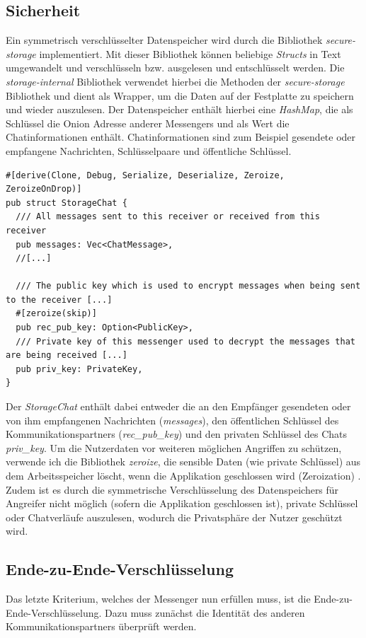 \documentclass[a4paper,ngerman, headheight=28pt,12pt]{scrartcl}
\newcommand{\vcite}[1]{\cite[vgl.][]{#1}}
\begin{document}
\subsection{Sicherheit}
Ein symmetrisch verschlüsselter Datenspeicher wird durch die Bibliothek \textit{secure-storage} implementiert. Mit dieser Bibliothek können beliebige \textit{Structs} in Text umgewandelt und verschlüsseln bzw. ausgelesen und entschlüsselt werden. Die \textit{storage-internal} Bibliothek verwendet hierbei die Methoden der \textit{secure-storage} Bibliothek und dient als Wrapper, um die Daten auf der Festplatte zu speichern und wieder auszulesen. Der Datenspeicher enthält hierbei eine \textit{HashMap}, die als Schlüssel die Onion Adresse anderer Messengers und als Wert die Chatinformationen enthält. Chatinformationen sind zum Beispiel gesendete oder empfangene Nachrichten, Schlüsselpaare und öffentliche Schlüssel.
\begin{verbatim}
#[derive(Clone, Debug, Serialize, Deserialize, Zeroize, ZeroizeOnDrop)]
pub struct StorageChat {
  /// All messages sent to this receiver or received from this receiver
  pub messages: Vec<ChatMessage>,
  //[...]

  /// The public key which is used to encrypt messages when being sent to the receiver [...]
  #[zeroize(skip)]
  pub rec_pub_key: Option<PublicKey>,
  /// Private key of this messenger used to decrypt the messages that are being received [...]
  pub priv_key: PrivateKey,
}
\end{verbatim}
Der \textit{StorageChat} enthält dabei entweder die an den Empfänger gesendeten oder von ihm empfangenen Nachrichten (\textit{messages}), den öffentlichen Schlüssel des Kommunikationspartners (\textit{rec\_pub\_key}) und den privaten Schlüssel des Chats \textit{priv\_key}.
Um die Nutzerdaten vor weiteren möglichen Angriffen zu schützen, verwende ich die Bibliothek \textit{zeroize}, die sensible Daten (wie private Schlüssel) aus dem Arbeitsspeicher löscht, wenn die Applikation geschlossen wird (Zeroization) \vcite{Zeroization}. Zudem ist es durch die symmetrische Verschlüsselung des Datenspeichers für Angreifer nicht möglich (sofern die Applikation geschlossen ist), private Schlüssel oder Chatverläufe auszulesen, wodurch die Privatsphäre der Nutzer geschützt wird.

\subsection{Ende-zu-Ende-Verschlüsselung}
Das letzte Kriterium, welches der Messenger nun erfüllen muss, ist die Ende-zu-Ende-Verschlüsselung. Dazu muss zunächst die Identität des anderen Kommunikationspartners überprüft werden.
\end{document}
